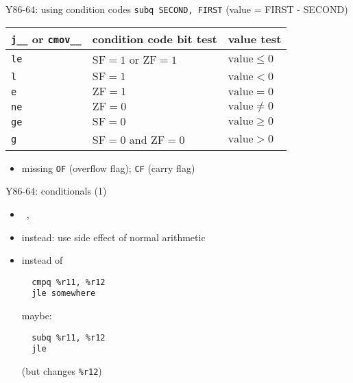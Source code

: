 \begin{frame}[label=ccodesUsing,fragile]{Y86-64: using condition codes}
\newcommand{\xvalue}{\text{value}}
{\small \lstinline|subq SECOND, FIRST| (value = FIRST - SECOND)}
\begin{tabular}{p{2cm}|l|l}
{\tt j{\it \_\_}} or {\tt cmov{\it \_\_}} & condition code bit test & value test \\ \hline
\tt le & $\text{SF} = 1$ or $\text{ZF} = 1$ & $\xvalue \le 0$ \\
\tt l &  $\text{SF} = 1$ & $\xvalue < 0$ \\
\tt e & $\text{ZF} = 1$ & $\xvalue = 0$ \\
\tt ne & $\text{ZF} = 0$ & $\xvalue \not= 0$ \\
\tt ge & $\text{SF} = 0$ & $\xvalue \ge 0$ \\
\tt g & $\text{SF} = 0$ and $\text{ZF} = 0$ & $\xvalue > 0$ \\
\end{tabular}
\begin{itemize}
\item missing {\tt OF} (overflow flag); {\tt CF} (carry flag)
\end{itemize}
\end{frame}

\begin{frame}[fragile,label=Y86conds1]{Y86-64: conditionals (1)}
\begin{itemize}
\item ~{\tt {}}, {\tt {}}
\item<2-> instead: use side effect of normal arithmetic
\item<3-> instead of
\begin{lstlisting}
  cmpq %r11, %r12
  jle somewhere
\end{lstlisting}
maybe:
\begin{lstlisting}
  subq %r11, %r12
  jle
\end{lstlisting}
(but changes {\tt \%r12})
\end{itemize}
\end{frame}


